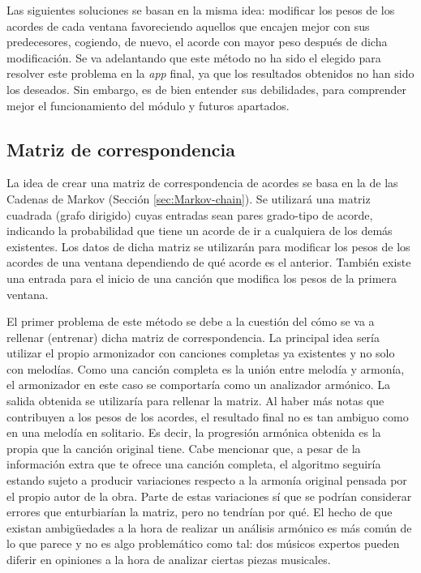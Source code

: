 Las siguientes soluciones se basan en la misma idea: modificar los pesos de los acordes de cada ventana favoreciendo aquellos que encajen mejor con sus predecesores, cogiendo, de nuevo, el acorde con mayor peso después de dicha modificación. Se va adelantando que este método no ha sido el elegido para resolver este problema en la \textit{app} final, ya que los resultados obtenidos no han sido los deseados. Sin embargo, es de bien entender sus debilidades, para comprender mejor el funcionamiento del módulo y futuros apartados.

\subsection{Matriz de correspondencia}\label{sec:arm:matriz_correspondencia}

La idea de crear una matriz de correspondencia de acordes se basa en la de las Cadenas de Markov (Sección \ref{sec:Markov-chain}). Se utilizará una matriz cuadrada (grafo dirigido) cuyas entradas sean pares grado-tipo de acorde, indicando la probabilidad que tiene un acorde de ir a cualquiera de los demás existentes. Los datos de dicha matriz se utilizarán para modificar los pesos de los acordes de una ventana dependiendo de qué acorde es el anterior. También existe una entrada para el inicio de una canción que modifica los pesos de la primera ventana.

El primer problema de este método se debe a la cuestión del cómo se va a rellenar (entrenar) dicha matriz de correspondencia. La principal idea sería utilizar el propio armonizador con canciones completas ya existentes y no solo con melodías. Como una canción completa es la unión entre melodía y armonía, el armonizador en este caso se comportaría como un analizador armónico. La salida obtenida se utilizaría para rellenar la matriz. Al haber más notas que contribuyen a los pesos de los acordes, el resultado final no es tan ambiguo como en una melodía en solitario. Es decir, la progresión armónica obtenida es la propia que la canción original tiene. Cabe mencionar que, a pesar de la información extra que te ofrece una canción completa, el algoritmo seguiría estando sujeto a producir variaciones respecto a la armonía original pensada por el propio autor de la obra. Parte de estas variaciones sí que se podrían considerar errores que enturbiarían la matriz, pero no tendrían por qué. El hecho de que existan ambigüedades a la hora de realizar un análisis armónico es más común de lo que parece y no es algo problemático como tal: dos músicos expertos pueden diferir en opiniones a la hora de analizar ciertas piezas musicales.

